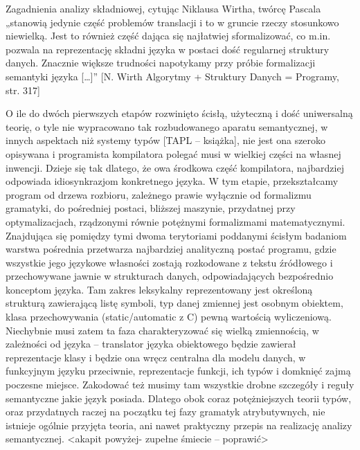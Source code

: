 Zagadnienia analizy składniowej,  cytując Niklausa Wirtha, twórcę Pascala „stanowią jedynie część problemów translacji i to w gruncie rzeczy stosunkowo niewielką. Jest to również część dająca się najłatwiej sformalizować, co m.in. pozwala na reprezentację składni języka w postaci dość regularnej struktury danych. Znacznie większe trudności napotykamy przy próbie formalizacji semantyki języka […]” [N. Wirth Algorytmy + Struktury Danych = Programy, str. 317]

O ile do dwóch pierwszych etapów rozwinięto ścisłą, użyteczną i dość uniwersalną teorię, o tyle nie wypracowano tak rozbudowanego aparatu semantycznej, w innych aspektach niż systemy typów [TAPL – książka], nie jest ona szeroko opisywana i programista kompilatora polegać musi w wielkiej części na własnej inwencji. Dzieje się tak dlatego, że owa środkowa część kompilatora, najbardziej odpowiada idiosynkrazjom konkretnego języka. W tym etapie, przekształcamy program od drzewa rozbioru, zależnego prawie wyłącznie od formalizmu gramatyki, do pośredniej postaci, bliższej maszynie, przydatnej przy optymalizacjach, rządzonymi równie potężnymi formalizmami matematycznymi. Znajdująca się pomiędzy tymi dwoma terytoriami poddanymi ścisłym badaniom warstwa pośrednia przetwarza najbardziej analityczną postać programu, gdzie wszystkie jego językowe własności zostają rozkodowane z tekstu źródłowego i przechowywane jawnie w strukturach danych, odpowiadających bezpośrednio konceptom języka. Tam zakres leksykalny reprezentowany jest określoną strukturą zawierającą listę symboli, typ danej zmiennej jest osobnym  obiektem, klasa przechowywania (static/automatic z C) pewną wartością wyliczeniową. Niechybnie musi zatem ta faza charakteryzować się wielką zmiennością, w zależności od języka – translator języka obiektowego będzie zawierał reprezentacje klasy i będzie ona wręcz centralna dla modelu danych, w funkcyjnym języku przeciwnie, reprezentacje funkcji, ich typów i domknięć zajmą poczesne miejsce. Zakodować też musimy tam wszystkie drobne szczegóły i reguły semantyczne jakie język posiada. Dlatego obok coraz potężniejszych teorii typów, oraz przydatnych raczej na początku tej fazy gramatyk atrybutywnych, nie istnieje ogólnie przyjęta teoria, ani nawet praktyczny przepis na realizację analizy semantycznej.
<akapit powyżej- zupełne śmiecie – poprawić>

